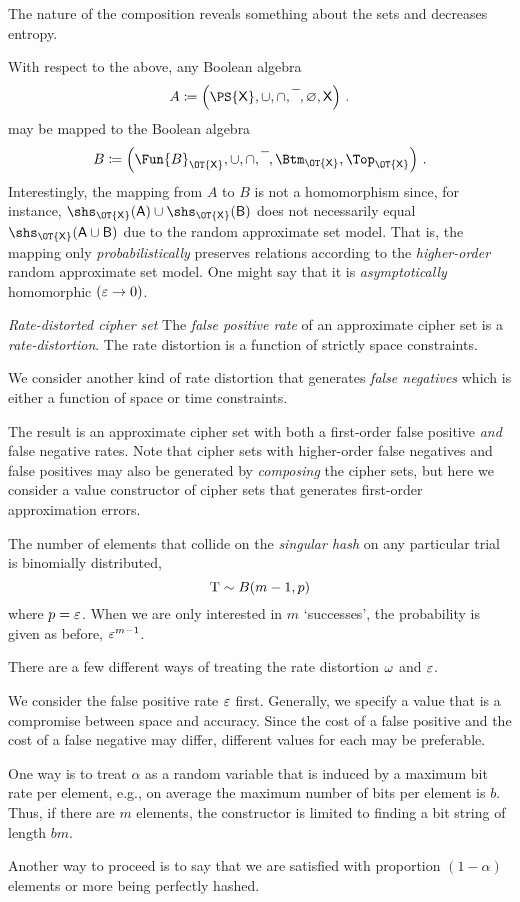 \documentclass[ ../main.tex]{subfiles}
\begin{document}
The nature of the composition reveals something about the sets and decreases entropy.

With respect to the above, any Boolean algebra
\begin{equation}
A \coloneqq \left(\PS{\Set{X}}, \SetUnion, \SetIntersection, \SetComplement, \EmptySet, \Set{X}\right)\,.
\end{equation}
may be mapped to the Boolean algebra
\begin{equation}
B \coloneqq \left(\Fun{B}_{\OT{\Set{X}}}, \SetUnion, \SetIntersection, \SetComplement, \Btm_{\OT{\Set{X}}}, \Top_{\OT{\Set{X}}}\right)\,.
\end{equation}
Interestingly, the mapping from $A$ to $B$ is not a homomorphism since, for instance, $\shs_{\OT{\Set{X}}}(\Set{A}) \SetUnion \shs_{\OT{\Set{X}}}(\Set{B})$ does not necessarily equal $\shs_{\OT{\Set{X}}}(\Set{A} \SetUnion \Set{B})$ due to the random approximate set model.
That is, the mapping only \emph{probabilistically} preserves relations according to the \emph{higher-order} random approximate set model.
One might say that it is \emph{asymptotically} homomorphic $(\varepsilon \to 0)$.






\emph{Rate-distorted cipher set}
The \emph{false positive rate} of an approximate cipher set is a \emph{rate-distortion}.
The rate distortion is a function of strictly space constraints.

We consider another kind of rate distortion that generates \emph{false negatives} which is either a function of space or time constraints.

The result is an approximate cipher set with both a first-order false positive \emph{and} false negative rates.
Note that cipher sets with higher-order false negatives and false positives may also be generated by \emph{composing} the cipher sets, but here we consider a value constructor of cipher sets that generates first-order approximation errors.

The number of elements that collide on the \emph{singular hash} on any particular trial is binomially distributed,
\begin{equation}
	\mathrm{T} \sim B(m-1,p)
\end{equation}
where $p = \varepsilon$.
When we are only interested in $m$ `successes', the probability is given as before, $\varepsilon^{m-1}$.

There are a few different ways of treating the rate distortion $\omega$ and $\varepsilon$.

We consider the false positive rate $\varepsilon$ first.
Generally, we specify a value that is a compromise between space and accuracy.
Since the cost of a false positive and the cost of a false negative may differ, different values for each may be preferable.

One way is to treat $\alpha$ as a random variable that is induced by a maximum bit rate per element, e.g., on average the maximum number of bits per element is $b$.
Thus, if there are $m$ elements, the constructor is limited to finding a bit string of length $b m$.

Another way to proceed is to say that we are satisfied with proportion $(1-\alpha)$ elements or more being perfectly hashed.
\end{document}
